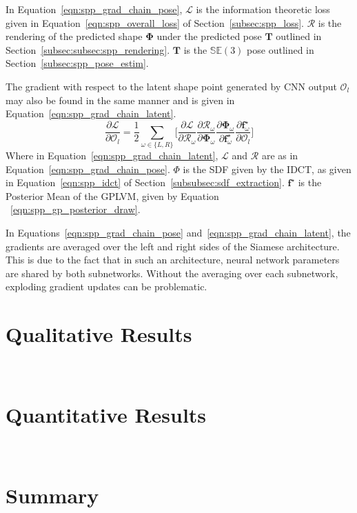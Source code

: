 In Equation~\ref{eqn:spp_grad_chain_pose}, \( \mathcal{L} \) is the information theoretic loss 
given in Equation~\ref{eqn:spp_overall_loss} of Section~\ref{subsec:spp_loss}.
\( \mathcal{R} \) is the rendering of the predicted shape \( \bm{\Phi} \) under the predicted 
pose \( \bm{T} \) outlined in Section~\ref{subsec:subsec:spp_rendering}. \( \bm{T} \) is the 
\( \mathbb{SE}(3) \) pose outlined in Section~\ref{subsec:spp_pose_estim}.

The gradient with respect to the latent shape point generated by CNN output \( \mathcal{O}_{l} \) may 
also be found in the same manner and is given in Equation~\ref{eqn:spp_grad_chain_latent}.
\begin{equation}
  \label{eqn:spp_grad_chain_latent}
  \frac{\partial \mathcal{L}}{\partial \mathcal{O}_{l}} = 
  \frac{1}{2} \sum_{\omega \in \{L, R\}} \Bigg[
    \frac{\partial \mathcal{L}}{\partial \mathcal{R}_{\omega}}
    \frac{\partial \mathcal{R}_{\omega}}{\partial \mathcal{\bm{\Phi}}_{\omega}}
    \frac{\partial \bm{\Phi}_{\omega}}{\partial \bm{f}^{\star}_{\omega}}
    \frac{\partial \bm{f}^{\star}_{\omega}}{\partial \mathcal{O}_{l}}
  \Bigg]
\end{equation}
Where in Equation~\ref{eqn:spp_grad_chain_latent}, \( \mathcal{L} \) and \( \mathcal{R} \) 
are as in Equation~\ref{eqn:spp_grad_chain_pose}. \( \Phi \) is the SDF given by the IDCT, 
as given in Equation~\ref{eqn:spp_idct} of Section~\ref{subsubsec:sdf_extraction}. 
\( \bm{f}^{\star} \) is the Posterior Mean of the GPLVM, given by Equation
~\ref{eqn:spp_gp_posterior_draw}.

In Equations~\ref{eqn:spp_grad_chain_pose} and~\ref{eqn:spp_grad_chain_latent}, the gradients 
are averaged over the left and right sides of the Siamese architecture. This is due to the fact 
that in such an architecture, neural network parameters are shared by both subnetworks. Without 
the averaging over each subnetwork, exploding gradient updates can be problematic.

\section{Qualitative Results}
~\label{sec:spp_qualitative}

\section{Quantitative Results}
~\label{sec:spp_quantitative}

\section{Summary}
~\label{sec:spp_discussion}